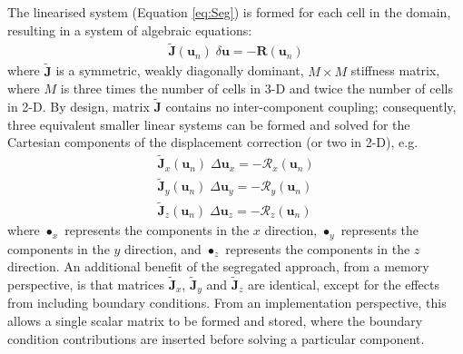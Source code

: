 \documentclass[sn-mathphys,Numbered]{sn-jnl}%
\newcommand{\bb}{\boldsymbol}
\begin{document}
The linearised system (Equation \ref{eq:Seg}) is formed for each cell in the domain, resulting in a system of algebraic equations:
\begin{eqnarray} \label{eq:SegSys}
    \bb{\tilde{J}}(\bb{u}_n) \; \delta \bb{u} = - \bb{R}(\bb{u}_n)
\end{eqnarray}
where $\bb{\tilde{J}}$ is a symmetric, weakly diagonally dominant, $M \times M$ stiffness matrix, where $M$ is three times the number of cells in 3-D and twice the number of cells in 2-D.
By design, matrix $\bb{\tilde{J}}$  contains no inter-component coupling; consequently, three equivalent smaller linear systems can be formed and solved for the Cartesian components of the displacement correction (or two in 2-D), e.g.
\begin{eqnarray} \label{eq:SegSysX}
     \bb{\tilde{J}}_x(\bb{u}_n)  \;  \Delta \bb{u}_x = - \mathcal{R}_x(\bb{u}_n) \label{eq:segX} \\
     \bb{\tilde{J}}_y(\bb{u}_n)  \;  \Delta \bb{u}_y = - \mathcal{R}_y(\bb{u}_n) \label{eq:segY} \\
     \bb{\tilde{J}}_z(\bb{u}_n)  \;  \Delta \bb{u}_z = - \mathcal{R}_z(\bb{u}_n) \label{eq:segZ}
\end{eqnarray}
where $ \bullet_x$ represents the components in the $x$ direction, $ \bullet_y$ represents the components in the $y$ direction, and $ \bullet_z$ represents the components in the $z$ direction.
An additional benefit of the segregated approach, from a memory perspective, is that matrices $ \bb{\tilde{J}}_x$, $ \bb{\tilde{J}}_y$ and $\bb{\tilde{J}}_z$ are identical, except for the effects from including boundary conditions.
From an implementation perspective, this allows a single scalar matrix to be formed and stored, where the boundary condition contributions are inserted before solving a particular component.
\end{document}
